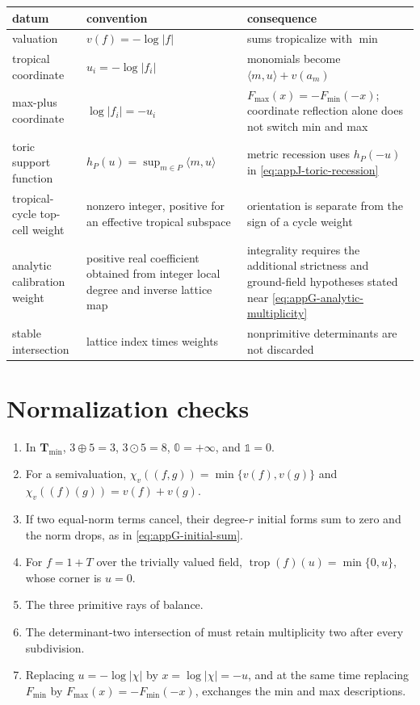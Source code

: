 \begin{center}
\begin{tabular}{p{}p{}p{}}
\toprule
datum & convention & consequence\\
\midrule
valuation & \(v(f)=-\log|f|\) & sums tropicalize with \(\min\)\\
tropical coordinate &
\(u_i=-\log|f_i|\) &
monomials become \(\langle m,u\rangle+v(a_m)\)\\
max-plus coordinate &
\(\log|f_i|=-u_i\) &
\(F_{\max}(x)=-F_{\min}(-x)\); coordinate reflection alone does not switch
min and max\\
toric support function &
\(h_P(u)=\sup_{m\in P}\langle m,u\rangle\) &
metric recession uses \(h_P(-u)\) in
\eqref{eq:appJ-toric-recession}\\
tropical-cycle top-cell weight &
nonzero integer, positive for an effective tropical subspace &
orientation is separate from the sign of a cycle weight\\
analytic calibration weight &
positive real coefficient obtained from integer local degree and inverse
lattice map &
integrality requires the additional strictness and ground-field hypotheses
stated near \eqref{eq:appG-analytic-multiplicity}\\
stable intersection &
lattice index times weights &
nonprimitive determinants are not discarded\\
\bottomrule
\end{tabular}
\end{center}

\section{Normalization checks}
\label{sec:appG-unit-tests}

\begin{enumerate}
\item In \(\mathbf T_{\min}\),
      \(3\oplus5=3\), \(3\odot5=8\),
      \(\mathbb0=+\infty\), and \(\mathbb1=0\).
\item For a semivaluation,
      \(\chi_v((f,g))=\min\{v(f),v(g)\}\) and
      \(\chi_v((f)(g))=v(f)+v(g)\).
\item If two equal-norm terms cancel, their degree-\(r\) initial forms sum
      to zero and the norm drops, as in
      \eqref{eq:appG-initial-sum}.
\item For \(f=1+T\) over the trivially valued field,
      \(\operatorname{trop}(f)(u)=\min\{0,u\}\), whose corner is \(u=0\).
\item The three primitive rays of
       balance.
\item The determinant-two intersection of
       must retain multiplicity two after
      every subdivision.
\item Replacing \(u=-\log|\chi|\) by \(x=\log|\chi|=-u\), and at the same
      time replacing \(F_{\min}\) by
      \(F_{\max}(x)=-F_{\min}(-x)\), exchanges the min and max
      descriptions.
\end{enumerate}


